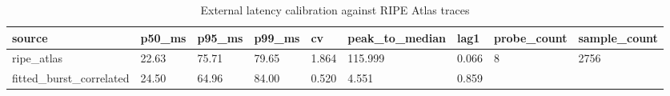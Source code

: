 \begin{table}[t]
\centering
\caption{External latency calibration against RIPE Atlas traces}
\label{tab:ripe_latency_calibration}
\scriptsize
\begin{tabular}{lllllllll}
\toprule
source & p50\_ms & p95\_ms & p99\_ms & cv & peak\_to\_median & lag1 & probe\_count & sample\_count \\
\midrule
ripe\_atlas & 22.63 & 75.71 & 79.65 & 1.864 & 115.999 & 0.066 & 8 & 2756 \\
fitted\_burst\_correlated & 24.50 & 64.96 & 84.00 & 0.520 & 4.551 & 0.859 &  &  \\
\bottomrule
\end{tabular}
\end{table}

